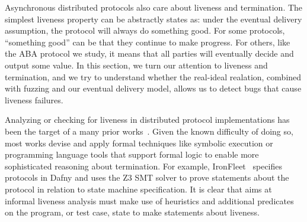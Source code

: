 Asynchronous distributed protocols also care about liveness and termination.
The simplest liveness property can be abstractly states as: under the eventual
delivery assumption, the protocol will always do something good.  For some
protocols, ``something good'' can be that they continue to make progress.  For
others, like the ABA protocol we study, it means that all parties will
eventually decide and output some value.  In this section, we turn our
attention to liveness and termination, and we try to understand whether the
real-ideal realation, combined with fuzzing and our eventual delivery model,
allows us to detect bugs that cause liveness failures.

Analyzing or checking for liveness in distributed protocol implementations has
been the target of a many prior works~\cite{ironfleet, macemc, bymc,
formalbyzantine}.  Given the known difficulty of doing so, most works devise
and apply formal techniques like symbolic execution or programming language
tools that support formal logic to enable more sophisticated reasoning about
termination.  For example, IronFleet~\cite{ironfleet} specifies protocols in
Dafny and uses the Z3 SMT solver to prove statements about the protocol in
relation to state machine specification.  It is clear that aims at informal
liveness analysis must make use of heuristics and additional predicates on the
program, or test case, state to make statements about liveness.

